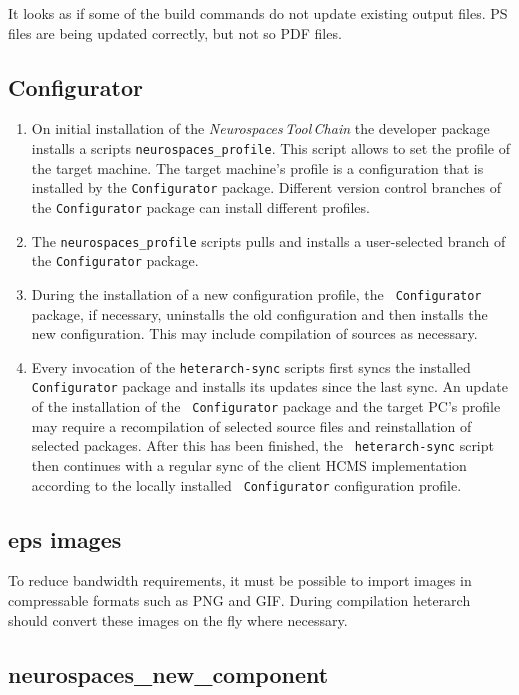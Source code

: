\documentclass[12pt]{article}
\begin{document}
It looks as if some of the build commands do not update existing
output files.  PS files are being updated correctly, but not so PDF
files.


\subsection{Configurator}

\begin{enumerate}
\item On initial installation of the {\it Neurospaces\,Tool\,Chain}
  the developer package installs a scripts {\tt neurospaces\_profile}.
  This script allows to set the profile of the target machine.  The
  target machine's profile is a configuration that is installed by the
  {\tt Configurator} package.  Different version control branches of
  the {\tt Configurator} package can install different profiles.
\item The {\tt neurospaces\_profile} scripts pulls and installs a
  user-selected branch of the {\tt Configurator} package.
\item During the installation of a new configuration profile, the {\tt
    Configurator} package, if necessary, uninstalls the old
  configuration and then installs the new configuration.  This may
  include compilation of sources as necessary.
\item Every invocation of the {\tt heterarch-sync} scripts first syncs
  the installed {\tt Configurator} package and installs its updates
  since the last sync.  An update of the installation of the {\tt
    Configurator} package and the target PC's profile may require a
  recompilation of selected source files and reinstallation of
  selected packages.  After this has been finished, the {\tt
    heterarch-sync} script then continues with a regular sync of the
  client HCMS implementation according to the locally installed {\tt
    Configurator} configuration profile.
\end{enumerate}

\subsection{eps images}

To reduce bandwidth requirements, it must be possible to import images
in compressable formats such as PNG and GIF.  During compilation
heterarch should convert these images on the fly where necessary.


\subsection{neurospaces\_new\_component}
\end{document}
